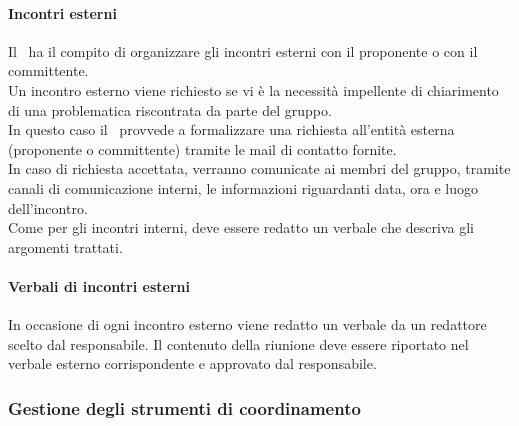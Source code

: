       \paragraph{Incontri esterni}
        Il \roleProjectManager\ ha il compito di organizzare gli incontri esterni con il proponente o con il committente.\\
        Un incontro esterno viene richiesto se vi è la necessità impellente di chiarimento di una problematica riscontrata da parte del gruppo.\\
        In questo caso il \roleProjectManager\ provvede a formalizzare una richiesta all’entità esterna (proponente o committente) tramite le mail di contatto fornite.\\
        In caso di richiesta accettata, verranno comunicate ai membri del gruppo, tramite canali di comunicazione interni, le informazioni riguardanti data, ora e luogo dell’incontro.\\
        Come per gli incontri interni, deve essere redatto un verbale che descriva gli argomenti trattati.
      \paragraph {Verbali di incontri esterni}
      In occasione di ogni incontro esterno viene redatto un verbale da un redattore scelto dal responsabile. Il contenuto della riunione deve essere riportato nel verbale esterno corrispondente e approvato dal responsabile.

    \subsubsection{Gestione degli strumenti di coordinamento}
